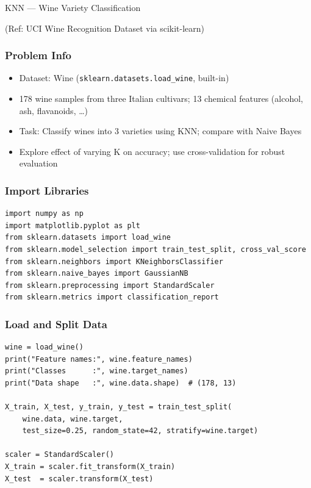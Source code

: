 \begin{frame}[fragile]\frametitle{}
\begin{center}
{\Large KNN --- Wine Variety Classification}

{\tiny (Ref: UCI Wine Recognition Dataset via scikit-learn)}
\end{center}
\end{frame}

\begin{frame}[fragile]\frametitle{Problem Info}
\begin{itemize}
\item Dataset: Wine (\texttt{sklearn.datasets.load\_wine}, built-in)
\item 178 wine samples from three Italian cultivars; 13 chemical features (alcohol, ash, flavanoids, \ldots)
\item Task: Classify wines into 3 varieties using KNN; compare with Naive Bayes
\item Explore effect of varying K on accuracy; use cross-validation for robust evaluation
\end{itemize}
\end{frame}

\begin{frame}[fragile]\frametitle{Import Libraries}
\begin{lstlisting}
import numpy as np
import matplotlib.pyplot as plt
from sklearn.datasets import load_wine
from sklearn.model_selection import train_test_split, cross_val_score
from sklearn.neighbors import KNeighborsClassifier
from sklearn.naive_bayes import GaussianNB
from sklearn.preprocessing import StandardScaler
from sklearn.metrics import classification_report
\end{lstlisting}
\end{frame}

\begin{frame}[fragile]\frametitle{Load and Split Data}
\begin{lstlisting}
wine = load_wine()
print("Feature names:", wine.feature_names)
print("Classes      :", wine.target_names)
print("Data shape   :", wine.data.shape)  # (178, 13)

X_train, X_test, y_train, y_test = train_test_split(
    wine.data, wine.target,
    test_size=0.25, random_state=42, stratify=wine.target)

scaler = StandardScaler()
X_train = scaler.fit_transform(X_train)
X_test  = scaler.transform(X_test)
\end{lstlisting}
\end{frame}

